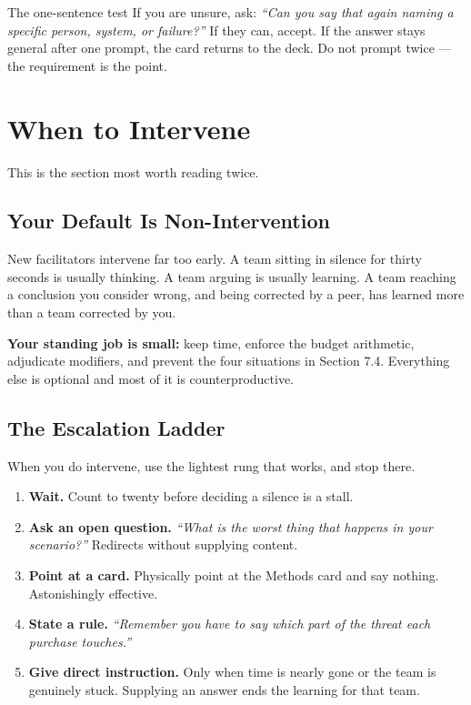 \documentclass[11pt,letterpaper]{article}
\newcommand{\say}[1]{\textit{``#1''}}
\begin{document}
\begin{note}{The one-sentence test}
If you are unsure, ask: \say{Can you say that again naming a specific person,
system, or failure?} If they can, accept. If the answer stays general after one
prompt, the card returns to the deck. Do not prompt twice --- the requirement is
the point.
\end{note}

\section{When to Intervene}

This is the section most worth reading twice.

\subsection{Your Default Is Non-Intervention}

New facilitators intervene far too early. A team sitting in silence for thirty
seconds is usually thinking. A team arguing is usually learning. A team reaching
a conclusion you consider wrong, and being corrected by a peer, has learned more
than a team corrected by you.

\textbf{Your standing job is small:} keep time, enforce the budget arithmetic,
adjudicate modifiers, and prevent the four situations in Section 7.4. Everything
else is optional and most of it is counterproductive.

\subsection{The Escalation Ladder}

When you do intervene, use the lightest rung that works, and stop there.

\begin{enumerate}[label=\textbf{Rung \arabic*.}, leftmargin=4.2em]
\item \textbf{Wait.} Count to twenty before deciding a silence is a stall.
\item \textbf{Ask an open question.} \say{What is the worst thing that happens
in your scenario?} Redirects without supplying content.
\item \textbf{Point at a card.} Physically point at the Methods card and say
nothing. Astonishingly effective.
\item \textbf{State a rule.} \say{Remember you have to say which part of the
threat each purchase touches.}
\item \textbf{Give direct instruction.} Only when time is nearly gone or the
team is genuinely stuck. Supplying an answer ends the learning for that team.
\end{enumerate}
\end{document}
